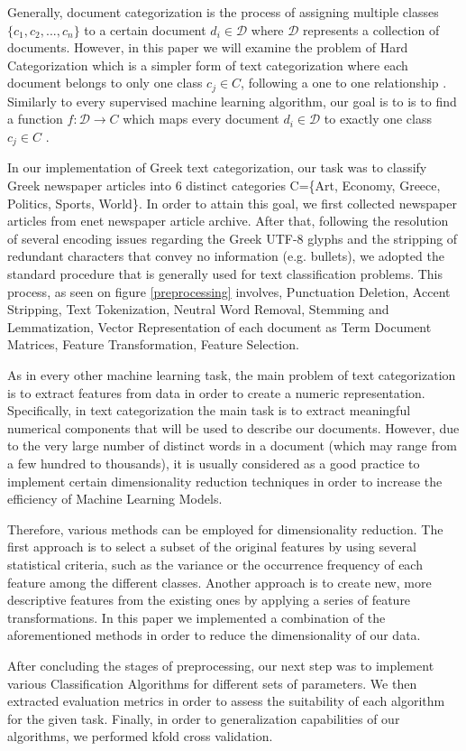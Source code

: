 \documentclass[10pt,journal,compsoc]{IEEEtran}
\begin{document}
\par
Generally, document categorization is the process of assigning
multiple classes $\{c_1,c_2,...,c_n\}$ to a certain document
$d_i\in \mathcal{D}$ where $\mathcal{D}$ represents a collection of documents.
However, in this paper we will examine the problem of Hard
Categorization which is a simpler form of text categorization
where each document belongs to only one class $c_j\in C$, 
following a one to one relationship \cite{a1}.
Similarly to every supervised machine learning algorithm,
our goal is to is to find a function $f: \mathcal{D}\rightarrow C$
which maps every document $d_i\in \mathcal{D}$ to exactly one
class $c_j \in C$ .
\par
In our implementation of Greek text categorization, our task
was to classify Greek newspaper articles into 6 distinct 
categories C=\{Art, Economy, Greece, Politics, Sports, World\}.
In order to attain this goal, we first collected newspaper articles
from enet newspaper article archive.
After that, following the resolution of several encoding issues 
regarding the Greek UTF-8 glyphs and the stripping of redundant
characters that convey no information (e.g. bullets), we adopted
the standard procedure that is generally used for text classification
problems.
This process, as seen on figure \ref{preprocessing} involves, 
Punctuation Deletion, Accent Stripping, Text Tokenization, 
Neutral Word Removal, Stemming and Lemmatization, 
Vector Representation of each document as Term Document Matrices, 
Feature Transformation, Feature Selection.
\par
As in every other machine learning task, the main problem of text
categorization is to extract features from data in order to create
a numeric representation.
Specifically, in text categorization the main task is to extract
meaningful numerical components that will be used to describe
our documents.
However, due to the very large number of distinct words in a
document (which may range from a few hundred to thousands), 
it is usually considered as a good practice to
implement certain dimensionality reduction techniques in
order to increase the efficiency of Machine Learning Models.
\par
Therefore, various methods can be employed for dimensionality 
reduction.
The first approach is to select a subset of the original features
by using several statistical criteria, such as the variance
or the occurrence frequency of each feature among the 
different classes.
Another approach is to create new, more descriptive features
from the existing ones by applying a series of feature 
transformations.
In this paper we implemented a combination of the aforementioned
methods in order to reduce the dimensionality of our data.
\par
After concluding the stages of preprocessing, our next step
was to implement various Classification Algorithms for different
sets of parameters.
We then extracted evaluation metrics in order to assess the
suitability of each algorithm for the given task.
Finally, in order to generalization capabilities of our algorithms,
we performed kfold cross validation.
\end{document}
